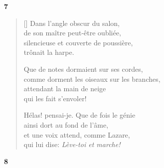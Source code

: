 \documentclass[a4paper,12pt]{book}
\begin{document}
\bigskip

\begin{center}
  \textbf{7}
\end{center}

\settowidth{\versewidth}{comme dorment les oiseaux sur les branches,}

\begin{verse}[\versewidth]
  Dans l'angle obscur du salon, \\
  de son maître peut-être oubliée, \\
  silencieuse et couverte de poussière, \\
  trônait la harpe.

  Que de notes dormaient sur ses cordes, \\
  comme dorment les oiseaux sur les branches, \\
  attendant la main de neige \\
  qui les fait s'envoler!

  Hélas! pensai-je. Que de fois le génie \\
  ainsi dort au fond de l'âme, \\
  et une voix attend, comme Lazare, \\
  qui lui dise: \emph{Lève-toi et marche!}
\end{verse}

\bigskip

\begin{center}
  \textbf{8}
\end{center}

\settowidth{\versewidth}{et m'inonder de leur lumière, et avec elles}
\end{document}
